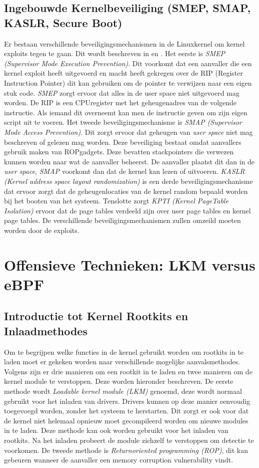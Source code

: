 \subsection{Ingebouwde Kernelbeveiliging (SMEP, SMAP, KASLR, Secure Boot)}
Er bestaan verschillende beveiligingsmechanismen in de Linux\-kernel om kernel exploits tegen te gaan. Dit wordt beschreven in \textcite{takaronis2024linux} en \textcite{LKMPwnPart1}. Het eerste is \emph{SMEP (Supervisor Mode Execution Prevention)}. Dit voorkomt dat een aanvaller die een kernel exploit heeft uitgevoerd en macht heeft gekregen over de RIP (Register Instruction Pointer) dit kan gebruiken om de pointer te verwijzen naar een eigen stuk code. \emph{SMEP} zorgt ervoor dat alles in de user space niet uitgevoerd mag worden. De RIP is een CPU\-register met het geheugenadres van de volgende instructie. Als iemand dit overneemt kan men de instructie geven om zijn eigen script uit te voeren.
Het tweede beveiligingsmechanisme is \emph{SMAP (Supervisor Mode Access Prevention)}. Dit zorgt ervoor dat geheugen van \emph{user space} niet mag beschreven of gelezen mag worden. Deze beveiliging bestaat omdat aanvallers gebruik maken van  ROP\-gadgets. Deze bevatten stack\-pointers die verwezen kunnen worden naar wat de aanvaller beheerst. De aanvaller plaatst dit dan in de \emph{user space}, \emph{SMAP} voorkomt dan dat de kernel kan lezen of uitvoeren. 
\emph{KASLR (Kernel address space layout randomization)} is een derde beveiligingsmechanisme dat ervoor zorgt dat de geheugenlocaties van de kernel random bepaald worden bij het booten van het systeem. 
Tenslotte zorgt \emph{KPTI (Kernel Page\-Table Isolation)} ervoor dat de page tables verdeeld zijn over user page tables en kernel page tables. De verschillende beveiligingsmechanismen zullen omzeild moeten worden door de exploits.  


\section{Offensieve Technieken: LKM versus eBPF}
\subsection{Introductie tot Kernel Rootkits en Inlaadmethodes}
Om te begrijpen welke functies in de kernel gebruikt worden om rootkits in te laden moet er gekeken worden naar verschillende mogelijke aanvalsmethodes. Volgens \textcite{nagy2025detecting} zijn er drie manieren om een rootkit in te laden en twee manieren om de kernel module te verstoppen. Deze worden hieronder beschreven. De eerste methode wordt \emph{Loadable kernel module (LKM)} genoemd, deze wordt normaal gebruikt voor het inladen van drivers. Drivers kunnen op deze manier eenvoudig toegevoegd worden, zonder het systeem te herstarten. Dit zorgt er ook voor dat de kernel niet helemaal opnieuw moet gecompileerd worden om nieuwe modules in te laden. Deze methode kan ook worden gebruikt voor het inladen van rootkits. Na het inladen probeert de module zichzelf te verstoppen om detectie te voorkomen. De tweede methode is \emph{Return\-oriented programming (ROP)}, dit kan gebeuren wanneer de aanvaller een memory corruption vulnerability vindt.

